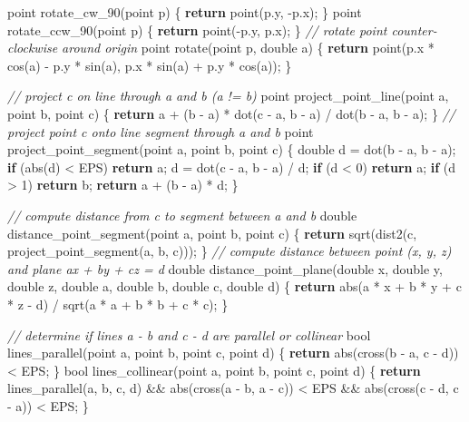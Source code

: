 \documentclass[10pt,]{article}
\newenvironment{Shaded}{}{}
\newcommand{\KeywordTok}[1]{\textcolor[rgb]{0.00,0.44,0.13}{\textbf{{#1}}}}
\newcommand{\DataTypeTok}[1]{\textcolor[rgb]{0.56,0.13,0.00}{{#1}}}
\newcommand{\DecValTok}[1]{\textcolor[rgb]{0.25,0.63,0.44}{{#1}}}
\newcommand{\CommentTok}[1]{\textcolor[rgb]{0.38,0.63,0.69}{\textit{{#1}}}}
\newcommand{\NormalTok}[1]{{#1}}
\begin{document}
\begin{Shaded}
\begin{Highlighting}[]
\NormalTok{point rotate_cw_90(point p) \{ }\KeywordTok{return} \NormalTok{point(p.y, -p.x); \}}
\NormalTok{point rotate_ccw_90(point p) \{ }\KeywordTok{return} \NormalTok{point(-p.y, p.x); \}}
\CommentTok{// rotate point counter-clockwise around origin}
\NormalTok{point rotate(point p, }\DataTypeTok{double} \NormalTok{a) \{}
    \KeywordTok{return} \NormalTok{point(p.x * cos(a) - p.y * sin(a), p.x * sin(a) + p.y * cos(a));}
\NormalTok{\}}

\CommentTok{// project c on line through a and b (a != b)}
\NormalTok{point project_point_line(point a, point b, point c) \{}
    \KeywordTok{return} \NormalTok{a + (b - a) * dot(c - a, b - a) / dot(b - a, b - a);}
\NormalTok{\}}
\CommentTok{// project point c onto line segment through a and b}
\NormalTok{point project_point_segment(point a, point b, point c) \{}
    \DataTypeTok{double} \NormalTok{d = dot(b - a, b - a);}
    \KeywordTok{if} \NormalTok{(abs(d) < EPS) }\KeywordTok{return} \NormalTok{a;}
    \NormalTok{d = dot(c - a, b - a) / d;}
    \KeywordTok{if} \NormalTok{(d < }\DecValTok{0}\NormalTok{) }\KeywordTok{return} \NormalTok{a;}
    \KeywordTok{if} \NormalTok{(d > }\DecValTok{1}\NormalTok{) }\KeywordTok{return} \NormalTok{b;}
    \KeywordTok{return} \NormalTok{a + (b - a) * d;}
\NormalTok{\}}

\CommentTok{// compute distance from c to segment between a and b}
\DataTypeTok{double} \NormalTok{distance_point_segment(point a, point b, point c) \{}
    \KeywordTok{return} \NormalTok{sqrt(dist2(c, project_point_segment(a, b, c)));}
\NormalTok{\}}
\CommentTok{// compute distance between point (x, y, z) and plane ax + by + cz = d}
\DataTypeTok{double} \NormalTok{distance_point_plane(}\DataTypeTok{double} \NormalTok{x, }\DataTypeTok{double} \NormalTok{y, }\DataTypeTok{double} \NormalTok{z,}
        \DataTypeTok{double} \NormalTok{a, }\DataTypeTok{double} \NormalTok{b, }\DataTypeTok{double} \NormalTok{c, }\DataTypeTok{double} \NormalTok{d) \{}
    \KeywordTok{return} \NormalTok{abs(a * x + b * y + c * z - d) / sqrt(a * a + b * b + c * c);}
\NormalTok{\}}

\CommentTok{// determine if lines a - b and c - d are parallel or collinear}
\DataTypeTok{bool} \NormalTok{lines_parallel(point a, point b, point c, point d) \{}
    \KeywordTok{return} \NormalTok{abs(cross(b - a, c - d)) < EPS;}
\NormalTok{\}}
\DataTypeTok{bool} \NormalTok{lines_collinear(point a, point b, point c, point d) \{}
    \KeywordTok{return} \NormalTok{lines_parallel(a, b, c, d) &&}
        \NormalTok{abs(cross(a - b, a - c)) < EPS &&}
        \NormalTok{abs(cross(c - d, c - a)) < EPS;}
\NormalTok{\}}


\end{Highlighting}
\end{Shaded}
\end{document}
